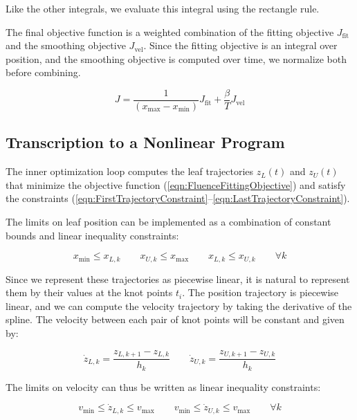 Like the other integrals, we evaluate this integral using the rectangle rule.

The final objective function is a weighted combination of the
fitting objective $J_\text{fit}$ and the smoothing objective $J_\text{vel}$.
Since the fitting objective is an integral over position, and the smoothing objective
is computed over time, we normalize both before combining.

\begin{equation}
  J = \frac{1}{(x_\text{max} - x_\text{min})} J_\text{fit}
    + \frac{\beta}{T} J_\text{vel}
\label{eqn:FluenceFittingObjective}
\end{equation}

\subsection{Transcription to a Nonlinear Program}

The inner optimization loop computes the leaf trajectories $z_L(t)$ and $z_U(t)$
that minimize the objective function (\ref{eqn:FluenceFittingObjective})
and satisfy the constraints (\ref{eqn:FirstTrajectoryConstraint}--\ref{eqn:LastTrajectoryConstraint}).

The limits on leaf position can be implemented as a combination of
constant bounds and linear inequality constraints:

\begin{equation}
  x_\text{min} \leq x_{L, k}
  \quad \quad
  x_{U, k} \leq x_\text{max}
  \quad \quad
  x_{L, k} \leq x_{U, k}
  \quad \quad
  \forall k
\end{equation}

Since we represent these trajectories as piecewise linear,
it is natural to represent them by their values at the knot points $t_i$.
The position trajectory is piecewise linear,
and we can compute the velocity trajectory by taking the derivative of the spline.
The velocity between each pair of knot points will be constant and given by:

\begin{equation}
  \dot{z}_{L, k} = \frac{z_{L, k+1} - z_{L, k}}{h_k}
  \quad \quad
  \dot{z}_{U, k} = \frac{z_{U, k+1} - z_{U, k}}{h_k}
\end{equation}

The limits on velocity can thus be written as linear inequality constraints:

\begin{equation}
  v_\text{min} \leq \dot{z}_{L, k} \leq v_\text{max}
  \quad \quad
  v_\text{min} \leq \dot{z}_{U, k} \leq v_\text{max}
  \quad \quad \forall k
\end{equation}

